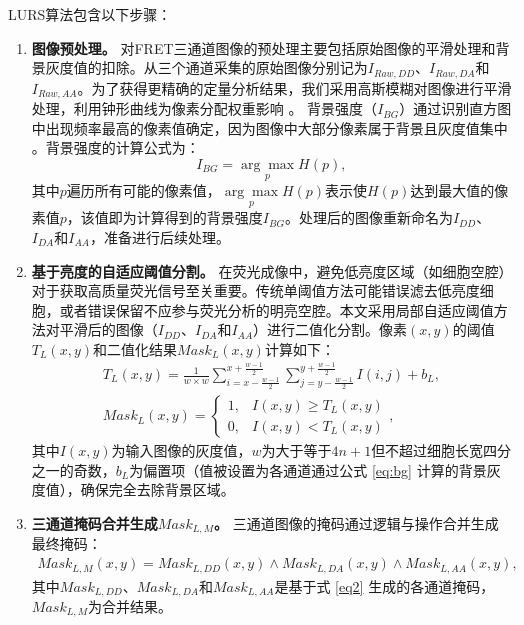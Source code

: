 LURS算法包含以下步骤：
\begin{enumerate}
\item \textbf{图像预处理。}  
对FRET三通道图像的预处理主要包括原始图像的平滑处理和背景灰度值的扣除。从三个通道采集的原始图像分别记为$I_{Raw,DD}$、$I_{Raw,DA}$和$I_{Raw,AA}$。为了获得更精确的定量分析结果，我们采用高斯模糊对图像进行平滑处理，利用钟形曲线为像素分配权重影响 。  
背景强度（$I_{BG}$）通过识别直方图中出现频率最高的像素值确定，因为图像中大部分像素属于背景且灰度值集中 。背景强度的计算公式为：
\begin{equation}
    I_{BG} = \underset{p}{\arg\max} H(p), 
    \label{eq:bg}
\end{equation}
其中$p$遍历所有可能的像素值，$\underset{p}{\arg\max} H(p)$表示使$H(p)$达到最大值的像素值$p$，该值即为计算得到的背景强度$I_{BG}$。处理后的图像重新命名为$I_{DD}$、$I_{DA}$和$I_{AA}$，准备进行后续处理。

\item \textbf{基于亮度的自适应阈值分割。}  
在荧光成像中，避免低亮度区域（如细胞空腔）对于获取高质量荧光信号至关重要。传统单阈值方法可能错误滤去低亮度细胞，或者错误保留不应参与荧光分析的明亮空腔。本文采用局部自适应阈值方法对平滑后的图像（$I_{DD}$、$I_{DA}$和$I_{AA}$）进行二值化分割。像素$(x, y)$的阈值$T_L(x,y)$和二值化结果${Mask}_L(x,y)$计算如下：
\begin{align}
    T_L(x,y)=\frac{1}{w \times w} \sum_{i=x-\frac{w-1}{2}}^{x+\frac{w-1}{2}} \sum_{j=y-\frac{w-1}{2}}^{y+\frac{w-1}{2}} I(i,j)+b_L,
    \label{eq1} \\
    {Mask}_L(x,y)=\begin{cases}
        1,&I(x,y) \geq T_L(x,y) \\
        0,&I(x,y) < T_L(x,y)
    \end{cases},
    \label{eq2}
\end{align}
其中$I(x,y)$为输入图像的灰度值，$w$为大于等于$4n+1$但不超过细胞长宽四分之一的奇数，$b_L$为偏置项（值被设置为各通道通过公式 \ref{eq:bg} 计算的背景灰度值），确保完全去除背景区域。

\item \textbf{三通道掩码合并生成${Mask}_{L, M}$。}  
三通道图像的掩码通过逻辑与操作合并生成最终掩码：
\begin{equation}
    \begin{split}
    {Mask}_{L, M}(x,y)={Mask}_{L, DD}(x,y) \land {Mask}_{L, DA}(x,y) \land {Mask}_{L, AA}(x,y),
    \end{split}
    \label{eq3}
\end{equation}
其中${Mask}_{L, DD}$、${Mask}_{L, DA}$和${Mask}_{L, AA}$是基于式 \ref{eq2} 生成的各通道掩码，${Mask}_{L, M}$为合并结果。


\end{enumerate}
